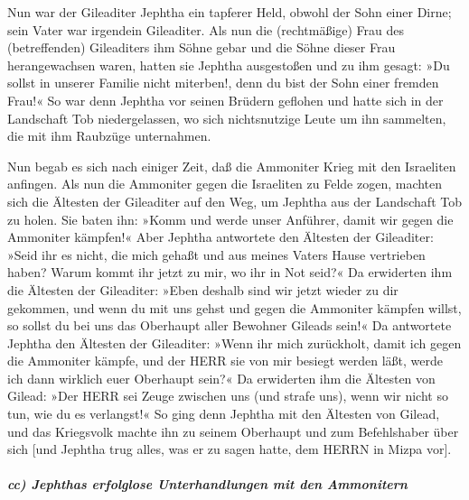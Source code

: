 Nun war der Gileaditer Jephtha ein tapferer Held, obwohl
der Sohn einer Dirne; sein Vater war irgendein Gileaditer.
Als nun die (rechtmäßige) Frau des (betreffenden)
Gileaditers ihm Söhne gebar und die Söhne dieser Frau herangewachsen
waren, hatten sie Jephtha ausgestoßen und zu ihm gesagt: »Du sollst in
unserer Familie nicht miterben!, denn du bist der Sohn einer fremden
Frau!« So war denn Jephtha vor seinen Brüdern geflohen und
hatte sich in der Landschaft Tob niedergelassen, wo sich nichtsnutzige
Leute um ihn sammelten, die mit ihm Raubzüge unternahmen.

Nun begab es sich nach einiger Zeit, daß die Ammoniter
Krieg mit den Israeliten anfingen. Als nun die Ammoniter
gegen die Israeliten zu Felde zogen, machten sich die Ältesten der
Gileaditer auf den Weg, um Jephtha aus der Landschaft Tob zu holen.
Sie baten ihn: »Komm und werde unser Anführer, damit wir
gegen die Ammoniter kämpfen!« Aber Jephtha antwortete den
Ältesten der Gileaditer: »Seid ihr es nicht, die mich gehaßt und aus
meines Vaters Hause vertrieben haben? Warum kommt ihr jetzt zu mir, wo
ihr in Not seid?« Da erwiderten ihm die Ältesten der
Gileaditer: »Eben deshalb sind wir jetzt wieder zu dir gekommen, und
wenn du mit uns gehst und gegen die Ammoniter kämpfen willst, so sollst
du bei uns das Oberhaupt aller Bewohner Gileads sein!« Da
antwortete Jephtha den Ältesten der Gileaditer: »Wenn ihr mich
zurückholt, damit ich gegen die Ammoniter kämpfe, und der HERR sie von
mir besiegt werden läßt, werde ich dann wirklich euer Oberhaupt sein?«
Da erwiderten ihm die Ältesten von Gilead: »Der HERR sei
Zeuge zwischen uns (und strafe uns), wenn wir nicht so tun, wie du es
verlangst!« So ging denn Jephtha mit den Ältesten von
Gilead, und das Kriegsvolk machte ihn zu seinem Oberhaupt und zum
Befehlshaber über sich {[}und Jephtha trug alles, was er zu sagen hatte,
dem HERRN in Mizpa vor{]}.

\hypertarget{cc-jephthas-erfolglose-unterhandlungen-mit-den-ammonitern}{%
\subparagraph{cc) Jephthas erfolglose Unterhandlungen mit den
Ammonitern}\label{cc-jephthas-erfolglose-unterhandlungen-mit-den-ammonitern}}

